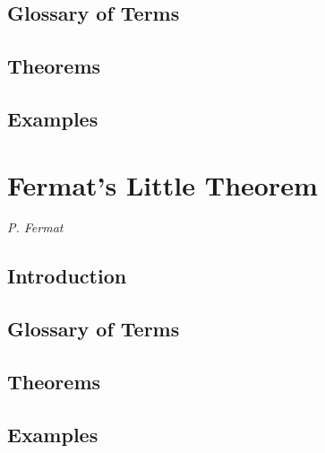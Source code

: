 \documentclass[12pt]{article}
\begin{document}
\subsection{Glossary of Terms}

\subsection{Theorems}

\subsection{Examples}


\section{Fermat's Little Theorem} %

\setcounter{equation}{0}
\setcounter{theorem}{0}

\begin{center}
{\it P. Fermat} %
\end{center}

\subsection{Introduction}

\subsection{Glossary of Terms}

\subsection{Theorems}

\subsection{Examples}

\end{document}
